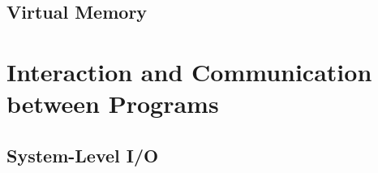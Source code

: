 \documentclass{memoir}
\begin{document}



\chapter{Virtual Memory}

\part{ Interaction and Communication between Programs}

\chapter{System-Level I/O}
\end{document}
